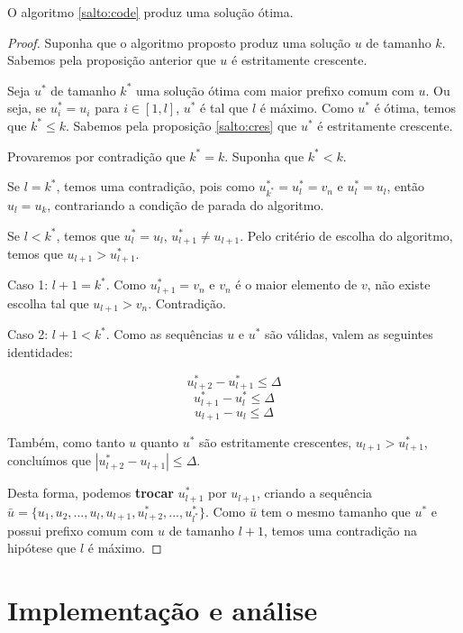 \begin{theo} \label{salto:proof}
O algoritmo \ref{salto:code} produz uma solução ótima.
\end{theo}
\begin{proof}

Suponha que o algoritmo proposto produz uma solução $u$ de tamanho $k$. Sabemos pela proposição anterior que $u$ é estritamente crescente.

Seja $u^*$ de tamanho $k^*$ uma solução ótima com maior prefixo comum com $u$. Ou seja, se $u^*_i = u_i$ para $i \in [1, l]$, $u^*$ é tal que $l$ é máximo. Como $u^*$ é ótima, temos que $k^* \leq k$. Sabemos pela proposição \ref{salto:cres} que $u^*$ é estritamente crescente.

Provaremos por contradição que $k^* = k$.  Suponha que $k^* < k$.

Se $l = k^*$, temos uma contradição, pois como $u^*_{k^*} = u^*_l = v_n$ e $u^*_l = u_l$, então $u_l = u_k$, contrariando a condição de parada do algoritmo. 

Se $l < k^*$, temos que $u^*_{l} = u_{l}$, $u^*_{l + 1} \neq u_{l + 1}$. Pelo critério de escolha do algoritmo, temos que $u_{l + 1} > u^*_{l + 1}$.

Caso 1: $l + 1 = k^*$. Como $u^*_{l + 1} = v_n$ e $v_n$ é o maior elemento de $v$, não existe escolha tal que $u_{l + 1} > v_n$. Contradição.

Caso 2: $l + 1 < k^*$. Como as sequências $u$ e $u^*$ são válidas, valem as seguintes identidades:

$$u^*_{l + 2} - u^*_{l + 1} \leq \Delta$$
$$u^*_{l + 1} - u^*_{l} \leq \Delta$$
$$u_{l + 1} - u_{l} \leq \Delta$$

Também, como tanto $u$ quanto $u^*$ são estritamente crescentes, $u_{l + 1} > u^*_{l + 1}$, concluímos que $|u^*_{l + 2} - u_{l + 1}| \leq \Delta$.

Desta forma, podemos \textbf{trocar} $u^*_{l + 1}$ por $u_{l + 1}$, criando a sequência $\bar{u} = \{u_1, u_2, ..., u_l, u_{l + 1}, u^*_{l + 2}, ..., u^*_{l^*}\}$. Como $\bar{u}$ tem o mesmo tamanho que $u^*$ e possui prefixo comum com $u$ de tamanho $l + 1$, temos uma contradição na hipótese que $l$ é máximo.

\end{proof}

\section{Implementação e análise}

